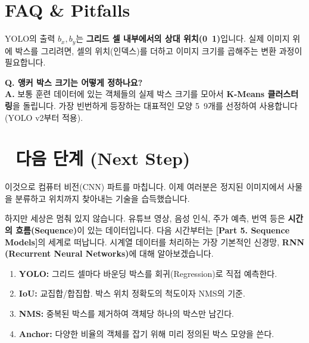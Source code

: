 \documentclass[11pt,a4paper]{book}
\theoremstyle{definition}
\begin{document}
\section{FAQ \& Pitfalls}

\begin{warningbox}[title={좌표계 주의}]
YOLO의 출력 $b_x, b_y$는 \textbf{그리드 셀 내부에서의 상대 위치(0~1)}입니다. 실제 이미지 위에 박스를 그리려면, 셀의 위치(인덱스)를 더하고 이미지 크기를 곱해주는 변환 과정이 필요합니다.
\end{warningbox}

\textbf{Q. 앵커 박스 크기는 어떻게 정하나요?} \\
\textbf{A.} 보통 훈련 데이터에 있는 객체들의 실제 박스 크기를 모아서 \textbf{K-Means 클러스터링}을 돌립니다. 가장 빈번하게 등장하는 대표적인 모양 5~9개를 선정하여 사용합니다 (YOLO v2부터 적용).

\section*{🔗 다음 단계 (Next Step)}
이것으로 컴퓨터 비전(CNN) 파트를 마칩니다. 이제 여러분은 정지된 이미지에서 사물을 분류하고 위치까지 찾아내는 기술을 습득했습니다.

하지만 세상은 멈춰 있지 않습니다. 유튜브 영상, 음성 인식, 주가 예측, 번역 등은 \textbf{시간의 흐름(Sequence)}이 있는 데이터입니다.
다음 시간부터는 \textbf{[Part 5. Sequence Models]}의 세계로 떠납니다. 시계열 데이터를 처리하는 가장 기본적인 신경망, \textbf{RNN (Recurrent Neural Networks)}에 대해 알아보겠습니다.

\vspace{0.5cm}

\begin{summarybox}[title={단원 요약 (Cheat Sheet)}]
\begin{enumerate}
    \item \textbf{YOLO:} 그리드 셀마다 바운딩 박스를 회귀(Regression)로 직접 예측한다.
    \item \textbf{IoU:} 교집합/합집합. 박스 위치 정확도의 척도이자 NMS의 기준.
    \item \textbf{NMS:} 중복된 박스를 제거하여 객체당 하나의 박스만 남긴다.
    \item \textbf{Anchor:} 다양한 비율의 객체를 잡기 위해 미리 정의된 박스 모양을 쓴다.
\end{enumerate}
\end{summarybox}


\end{document}
